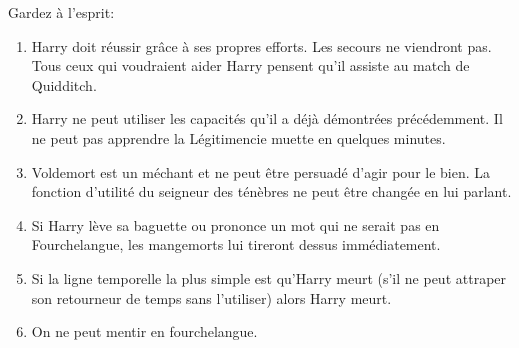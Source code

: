 Gardez à l'esprit:
\begin{enumerate}
\item Harry doit réussir grâce à ses propres efforts. Les secours ne viendront pas. Tous ceux qui voudraient aider Harry pensent qu'il assiste au match de Quidditch. 
\item Harry ne peut utiliser les capacités qu'il a déjà démontrées précédemment. Il ne peut pas apprendre la Légitimencie muette en quelques minutes.
\item Voldemort est un méchant et ne peut être persuadé d'agir pour le bien. La fonction d'utilité du seigneur des ténèbres ne peut être changée en lui parlant.
\item Si Harry lève sa baguette ou prononce un mot qui ne serait pas en Fourchelangue, les mangemorts lui tireront dessus immédiatement.
\item Si la ligne temporelle la plus simple est qu'Harry meurt (s'il ne peut attraper son retourneur de temps sans l'utiliser) alors Harry meurt.
\item On ne peut mentir en fourchelangue.
\end{enumerate}
